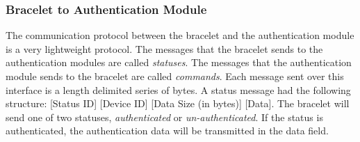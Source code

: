 \subsubsection{Bracelet to Authentication Module}

The communication protocol between the bracelet and the authentication module is a very lightweight protocol.  The messages that the bracelet sends to the authentication modules are called \emph{statuses}.  The messages that the authentication module sends to the bracelet are called \emph{commands}.  Each message sent over this interface is a length delimited series of bytes. A status message had the following structure: [Status ID] [Device ID] [Data Size (in bytes)] [Data]. The bracelet will send one of two statuses, \emph{authenticated} or \emph{un-authenticated}. If the status is authenticated, the authentication data will be transmitted in the data field.



